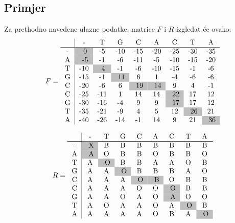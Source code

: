 \documentclass[times, utf8, zavrsni]{fer}
\begin{document}
\subsection{Primjer}
Za prethodno navedene ulazne podatke, matrice $F$ i $R$ izgledat će ovako:
$$
F =
\begin{tabular}{c|cccccccc}
 & - & T & G & C & A & C & T & A \\\specialrule{0.5pt}{0pt}{0pt}
- & \cellcolor{lightgray} 0 & -5 & -10 & -15 & -20 & -25 & -30 & -35 \\ 
A & \cellcolor{lightgray} -5 & -1 & -6 & -11 & -5 & -10 & -15 & -20 \\ 
T & -10 & \cellcolor{lightgray} 4 & -1 & -6 & -10 & -15 & -1 & -6 \\ 
G & -15 & -1 & \cellcolor{lightgray} 11 & 6 & 1 & -4 & -6 & -6 \\ 
C & -20 & -6 & 6 & \cellcolor{lightgray} 19 & \cellcolor{lightgray} 14 & 9 & 4 & -1 \\ 
C & -25 & -11 & 1 & 14 & 14 & \cellcolor{lightgray} 22 & 17 & 12 \\ 
G & -30 & -16 & -4 & 9 & 9 & \cellcolor{lightgray} 17 & 17 & 12 \\ 
T & -35 & -21 & -9 & 4 & 5 & 12 & \cellcolor{lightgray} 26 & 21 \\ 
A & -40 & -26 & -14 & -1 & 14 & 9 & 21 & \cellcolor{lightgray} 36 \\ 
\end{tabular}
$$

$$
R =
\begin{tabular}{c|cccccccc}
 & - & T & G & C & A & C & T & A \\\specialrule{0.5pt}{0pt}{0pt}
- & \cellcolor{lightgray} X & B & B & B & B & B & B & B \\ 
A & \cellcolor{lightgray} A & O & B & B & O & B & B & O \\ 
T & A & \cellcolor{lightgray} O & B & B & A & A & O & B \\ 
G & A & A & \cellcolor{lightgray} O & B & B & B & A & O \\ 
C & A & A & A & \cellcolor{lightgray} O & \cellcolor{lightgray} B & O & B & B \\ 
C & A & A & A & O & O & \cellcolor{lightgray} O & B & B \\ 
G & A & A & O & A & O & \cellcolor{lightgray} A & O & O \\ 
T & A & O & A & A & O & A & \cellcolor{lightgray} O & B \\ 
A & A & A & A & A & O & B & A & \cellcolor{lightgray} O \\ 
\end{tabular}
$$
\end{document}
